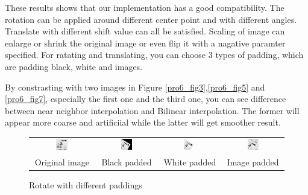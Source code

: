 \documentclass[11pt,a4paper]{article}
\begin{document}
These results shows that our implementation has a good compatibility. The rotation 
can be applied around different center point and with different angles. Translate 
with different shift value can all be satisfied. Scaling of image can enlarge or shrink 
the original image or even flip it with a nagative paramter specified. For ratating 
and translating, you can choose 3 types of padding, which are padding black, white and images.

By constrasting with two images in Figure \ref{pro6_fig3},\ref{pro6_fig5} and \ref{pro6_fig7},
especially the first one and the third one, you can see difference between near neighbor interpolation 
and Bilinear interpolation. The former will appear more coarse and artificiial while the latter
will get smoother result.

\begin{figure}[!htbp]
	\centering
	\begin{tabular}{cccc} 
		\includegraphics[width=0.2\textwidth]{pro6/rotate/originRotate}&
		\includegraphics[width=0.2\textwidth]{pro6/rotate/rotate_30_black}&
		\includegraphics[width=0.2\textwidth]{pro6/rotate/rotate_30_white}&
		\includegraphics[width=0.2\textwidth]{pro6/rotate/rotate_30_image}\\
		Original image & Black padded& White padded & Image padded
	\end{tabular}
	\caption{Rotate with different paddings}
	\label{pro6_fig1}
\end{figure}
\end{document}
